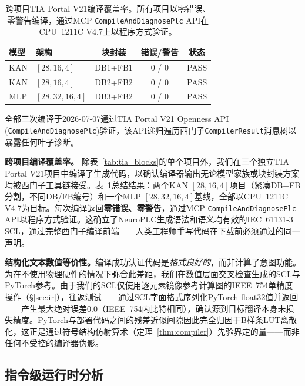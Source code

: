 \documentclass[journal,onecolumn]{IEEEtran}
\theoremstyle{definition}
\theoremstyle{plain}
\theoremstyle{remark}
\begin{document}
\begin{table}[!t]
\centering
\caption{跨项目TIA Portal V21编译覆盖率。所有项目以零错误、零警告编译，通过MCP \texttt{CompileAndDiagnosePlc} API在CPU~1211C V4.7上以程序方式验证。}
\label{tab:tia_compile}
\small
\begin{tabular}{@{}llccc@{}}
\toprule
\textbf{模型} & \textbf{架构} & \textbf{块封装} & \textbf{错误/警告} & \textbf{状态} \\
\midrule
KAN & $[28,16,4]$    & DB1+FB1 & 0 / 0 & PASS \\
KAN & $[28,16,4]$    & DB2+FB2 & 0 / 0 & PASS \\
MLP & $[28,32,16,4]$ & DB3+FB2 & 0 / 0 & PASS \\
\bottomrule
\end{tabular}
\vspace{2pt}
{\scriptsize 全部三次编译于2026-07-07通过TIA Portal V21 Openness API (\texttt{CompileAndDiagnosePlc})验证，该API递归遍历西门子\texttt{CompilerResult}消息树以暴露任何叶子诊断。}
\end{table}

\vspace{4pt}
\noindent\textbf{跨项目编译覆盖率。}
除表~\ref{tab:tia_blocks}的单个项目外，我们在三个独立TIA Portal V21项目中编译了生成代码，以确认编译器输出无论模型家族或块封装方案均被西门子工具链接受。表~\ref{tab:tia_compile}总结结果：两个KAN $[28,16,4]$项目（紧凑DB+FB分割，不同DB/FB编号）和一个MLP $[28,32,16,4]$基线，全部以CPU~1211C V4.7为目标。每次编译返回\textbf{零错误、零警告}，通过MCP \texttt{CompileAndDiagnosePlc} API以程序方式验证。这确立了NeuroPLC生成语法和语义均有效的IEC~61131-3 SCL，通过完整西门子编译前端——人类工程师手写代码在下载前必须通过的同一声明。

\vspace{2pt}
\noindent\textbf{结构化文本数值等价性。}编译成功认证代码是\textit{格式良好的}，而非计算了意图功能。为在不使用物理硬件的情况下弥合此差距，我们在数值层面交叉检查生成的SCL与PyTorch参考。由于我们的SCL仅使用逐元素镜像参考计算图的IEEE~754单精度操作（\S\ref{sec:ir}），往返测试——通过SCL字面格式序列化PyTorch float32值并返回——产生最大绝对误差$0.0$（IEEE~754内比特相同），确认源到目标翻译本身未损失精度。PyTorch与部署代码之间的残差近似间隙因此完全归因于B样条LUT离散化，这正是通过符号结构仿射算术（定理~\ref{thm:compiler}）先验界定的量——而非任何不受控的编译器伪影。

\subsection{指令级运行时分析}
\label{sec:runtime}
\end{document}
